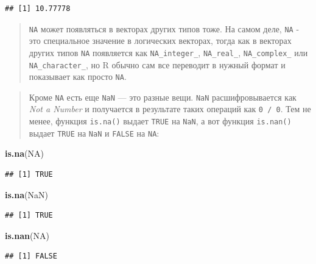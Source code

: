 \documentclass[]{book}
\newenvironment{Shaded}{\begin{snugshade}}{\end{snugshade}}
\newcommand{\KeywordTok}[1]{\textcolor[rgb]{0.13,0.29,0.53}{\textbf{#1}}}
\newcommand{\OtherTok}[1]{\textcolor[rgb]{0.56,0.35,0.01}{#1}}
\newcommand{\NormalTok}[1]{#1}
\begin{document}
\begin{verbatim}
## [1] 10.77778
\end{verbatim}

\begin{quote}
\texttt{NA} может появляться в векторах других типов тоже. На самом
деле, \texttt{NA} - это специальное значение в логических векторах,
тогда как в векторах других типов \texttt{NA} появляется как
\texttt{NA\_integer\_}, \texttt{NA\_real\_}, \texttt{NA\_complex\_} или
\texttt{NA\_character\_}, но R обычно сам все переводит в нужный формат
и показывает как просто \texttt{NA}.
\end{quote}

\begin{quote}
Кроме \texttt{NA} есть еще \texttt{NaN} --- это разные вещи.
\texttt{NaN} расшифровывается как \emph{Not a Number} и получается в
результате таких операций как \texttt{0\ /\ 0}. Тем не менее, функция
\texttt{is.na()} выдает \texttt{TRUE} на \texttt{NaN}, а вот функция
\texttt{is.nan()} выдает \texttt{TRUE} на \texttt{NaN} и \texttt{FALSE}
на \texttt{NA}:
\end{quote}

\begin{Shaded}
\begin{Highlighting}[]
\KeywordTok{is.na}\NormalTok{(}\OtherTok{NA}\NormalTok{)}
\end{Highlighting}
\end{Shaded}

\begin{verbatim}
## [1] TRUE
\end{verbatim}

\begin{Shaded}
\begin{Highlighting}[]
\KeywordTok{is.na}\NormalTok{(}\OtherTok{NaN}\NormalTok{)}
\end{Highlighting}
\end{Shaded}

\begin{verbatim}
## [1] TRUE
\end{verbatim}

\begin{Shaded}
\begin{Highlighting}[]
\KeywordTok{is.nan}\NormalTok{(}\OtherTok{NA}\NormalTok{)}
\end{Highlighting}
\end{Shaded}

\begin{verbatim}
## [1] FALSE
\end{verbatim}
\end{document}
